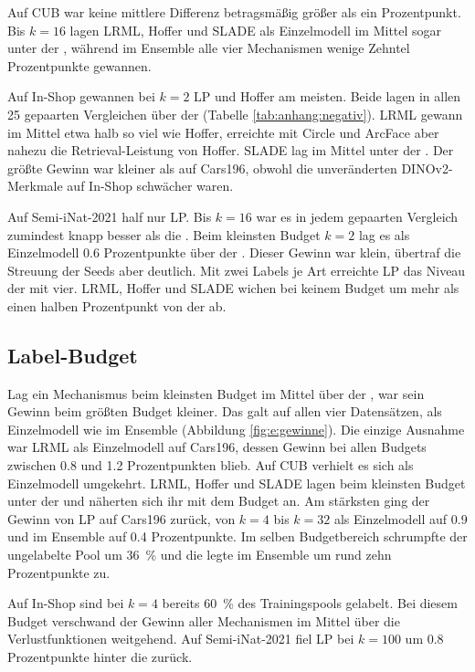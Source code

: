 Auf \ac{CUB} war keine mittlere Differenz betragsmäßig größer als ein Prozentpunkt. Bis $k=16$ lagen \ac{LRML}, Hoffer und \ac{SLADE} als Einzelmodell im Mittel sogar unter der \UEBL, während im Ensemble alle vier Mechanismen wenige Zehntel Prozentpunkte gewannen.

Auf In-Shop gewannen bei $k=2$ \ac{LP} und Hoffer am meisten. Beide lagen in allen 25 gepaarten Vergleichen über der \UEBL (Tabelle \ref{tab:anhang:negativ}). \ac{LRML} gewann im Mittel etwa halb so viel wie Hoffer, erreichte mit Circle und ArcFace aber nahezu die Retrieval-Leistung von Hoffer. \ac{SLADE} lag im Mittel unter der \UEBL. Der größte Gewinn war kleiner als auf Cars196, obwohl die unveränderten DINOv2-Merkmale auf In-Shop schwächer waren.

Auf Semi-iNat-2021 half nur \ac{LP}. Bis $k=16$ war es in jedem gepaarten Vergleich zumindest knapp besser als die \UEBL. Beim kleinsten Budget $k=2$ lag es als Einzelmodell \num{0.6} Prozentpunkte über der \UEBL. Dieser Gewinn war klein, übertraf die Streuung der Seeds aber deutlich. Mit zwei Labels je Art erreichte \ac{LP} das Niveau der \UEBL mit vier. \ac{LRML}, Hoffer und \ac{SLADE} wichen bei keinem Budget um mehr als einen halben Prozentpunkt von der \UEBL ab.

\subsection{Label-Budget}
\label{sec:e:budget}

Lag ein Mechanismus beim kleinsten Budget im Mittel über der \UEBL, war sein Gewinn beim größten Budget kleiner. Das galt auf allen vier Datensätzen, als Einzelmodell wie im Ensemble (Abbildung \ref{fig:e:gewinne}). Die einzige Ausnahme war \ac{LRML} als Einzelmodell auf Cars196, dessen Gewinn bei allen Budgets zwischen \num{0.8} und \num{1.2} Prozentpunkten blieb. Auf \ac{CUB} verhielt es sich als Einzelmodell umgekehrt. \ac{LRML}, Hoffer und \ac{SLADE} lagen beim kleinsten Budget unter der \UEBL und näherten sich ihr mit dem Budget an. Am stärksten ging der Gewinn von \ac{LP} auf Cars196 zurück, von $k=4$ bis $k=32$ als Einzelmodell auf \num{0.9} und im Ensemble auf \num{0.4} Prozentpunkte. Im selben Budgetbereich schrumpfte der ungelabelte Pool um \qty{36}{\percent} und die \UEBL legte im Ensemble um rund zehn Prozentpunkte zu.

Auf In-Shop sind bei $k=4$ bereits \qty{60}{\percent} des Trainingspools gelabelt. Bei diesem Budget verschwand der Gewinn aller Mechanismen im Mittel über die Verlustfunktionen weitgehend. Auf Semi-iNat-2021 fiel \ac{LP} bei $k=100$ um \num{0.8} Prozentpunkte hinter die \UEBL zurück.

